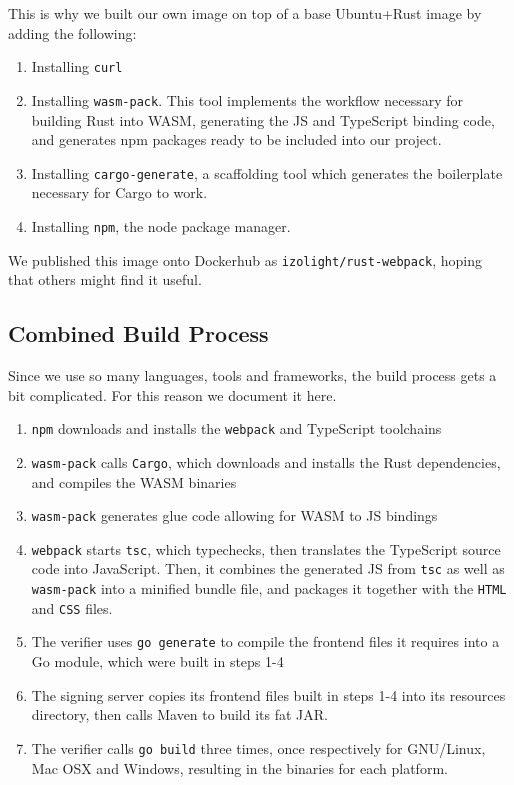 This is why we built our own image on top of a base Ubuntu+Rust image by adding the following:
\begin{enumerate}
    \item Installing \texttt{curl}
    \item Installing \texttt{wasm-pack}.
    This tool implements the workflow necessary for building Rust into \gls{WASM},
    generating the \gls{JS} and TypeScript binding code,
    and generates npm packages ready to be included into our project.
    \item Installing \texttt{cargo-generate}, a scaffolding tool which generates the boilerplate necessary for Cargo to work.
    \item Installing \texttt{npm}, the node package manager.
\end{enumerate}

We published this image onto Dockerhub as \texttt{izolight/rust-webpack},
hoping that others might find it useful.

\subsection{Combined Build Process}\label{subsec:combined-build-process}
Since we use so many languages, tools and frameworks,
the build process gets a bit complicated.
For this reason we document it here.

\begin{enumerate}
    \item \texttt{npm} downloads and installs the \texttt{webpack} and TypeScript toolchains
    \item \texttt{wasm-pack} calls \texttt{Cargo},
    which downloads and installs the Rust dependencies,
    and compiles the \gls{WASM} binaries
    \item \texttt{wasm-pack} generates glue code allowing for \gls{WASM} to \gls{JS} bindings
    \item \texttt{webpack} starts \texttt{tsc}, which typechecks,
    then translates the TypeScript source code into JavaScript.
    Then, it combines the generated \gls{JS} from \texttt{tsc} as well as \texttt{wasm-pack} into a minified bundle file,
    and packages it together with the \texttt{HTML} and \texttt{CSS} files.
    \item The verifier uses \texttt{go generate} to compile the frontend files it requires into a Go module,
    which were built in steps 1-4
    \item The signing server copies its frontend files built in steps 1-4 into its resources directory,
    then calls Maven to build its fat \gls{JAR}.
    \item The verifier calls \texttt{go build} three times,
    once respectively for GNU/Linux, Mac OSX and Windows,
    resulting in the binaries for each platform.
\end{enumerate}


